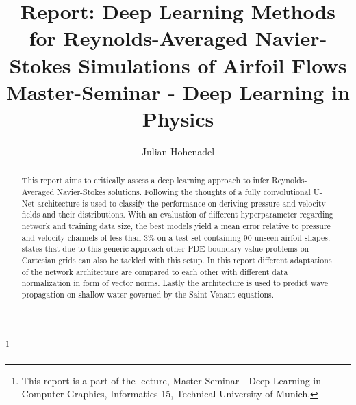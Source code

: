 \documentclass[acmtog]{techreportacmart}
\begin{document}
\title{Report: Deep Learning Methods for Reynolds-Averaged Navier-Stokes Simulations of
Airfoil Flows \\ Master-Seminar - Deep Learning in Physics} 
\author{Julian Hohenadel}

\renewcommand\shortauthors{Hohenadel}

\begin{abstract}
This report aims to critically assess a deep learning approach to infer Reynolds-Averaged Navier-Stokes solutions. Following the thoughts of \cite{Thuerey20} a fully convolutional U-Net architecture is used to classify the performance on deriving pressure and velocity fields and their distributions. With an evaluation of different hyperparameter regarding network and training data size, the best models yield a mean error relative to pressure and velocity channels of less than 3\% on a test set containing 90 unseen airfoil shapes. \cite{Thuerey20} states that due to this generic approach other PDE boundary value problems on Cartesian grids can also be tackled with this setup. In this report different adaptations of the network architecture are compared to each other with different data normalization in form of vector norms. Lastly the architecture is used to predict wave propagation on shallow water governed by the Saint-Venant equations.
\end{abstract}

%
%



\thanks{This report is a part of the lecture, Master-Seminar - Deep Learning in
  Computer Graphics, Informatics 15, Technical University of Munich.}


\maketitle
\end{document}
